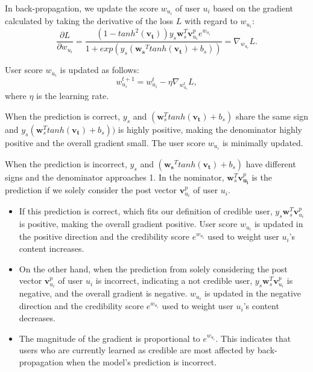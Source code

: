 \documentclass{bmcart}
\begin{document}
In back-propagation, we update the score $w_{u_i}$ of user $u_i$ based on the gradient calculated by taking the derivative of the loss $L$ 
with regard to $w_{u_i}$:
\begin{equation}
    \frac{\partial L}{\partial w_{u_i}} = \frac{(1-tanh^2(\boldsymbol{v_t})){y_s}\boldsymbol{w}_{s}^T \boldsymbol{v}^{p}_{u_i}e^{w_{u_i}}}{1+exp(y_s(\boldsymbol{w_s}^T tanh(\boldsymbol{v_t})+b_s))}=\nabla_{w_{u_i}}L.
\end{equation}

User score $w_{u_i}$ is updated as follows: 
\begin{equation}
    w^{t+1}_{u_i} = w^{t}_{u_i} - \eta\nabla_{w^{t}_{u_i}}L,
\end{equation}
where $\eta$ is the learning rate.

When the prediction is correct, $y_s$ and $(\boldsymbol{w}_{s}^T tanh(\boldsymbol{v_t})+b_s)$ share the same sign and $y_s(\boldsymbol{w}_{s}^T tanh(\boldsymbol{v_t})+b_s))$ is highly positive, making the denominator highly positive and the overall gradient small. The user score $w_{u_i}$ is minimally updated.

When the prediction is incorrect, $y_s$ and $(\boldsymbol{w_s}^T tanh(\boldsymbol{v_t})+b_s)$ have different signs and the denominator approaches 1. In the nominator, $\boldsymbol{w}_{s}^T \boldsymbol{v}^{p}_{\boldsymbol{u_i}}$ is the prediction if we solely consider the post vector $\boldsymbol{v}^{p}_{u_i}$ of user $u_i$. 
\begin{itemize}
    \item If this prediction is correct, which fits our definition of credible user, ${y_s}\boldsymbol{w}_{s}^T \boldsymbol{v}^{p}_{u_{i}}$ is positive, making the overall gradient positive. User score $w_{u_i}$ is updated in the positive direction and the credibility score $e^{w_{u_i}}$ used to weight user $u_i$'s content increases.
    \item On the other hand, when the prediction from solely considering the post vector $\boldsymbol{v}^{p}_{u_{i}}$ of user $u_i$ is incorrect, indicating a not credible user, ${y_s}\boldsymbol{w}_{s}^T \boldsymbol{v}^{p}_{u_{i}}$ is negative, and the overall gradient is negative. $w_{u_i}$ is updated in the negative direction and the credibility score $e^{w_{u_i}}$ used to weight user $u_i$'s content decreases.
    \item The magnitude of the gradient is proportional to $e^{w_{u_i}}$. This indicates that users who are currently learned as credible are most affected by back-propagation when the model's prediction is incorrect.
\end{itemize}
\end{document}
